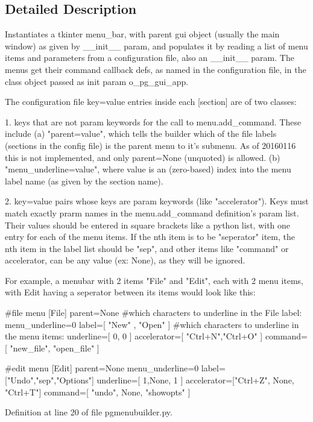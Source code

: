 \subsection{Detailed Description}
\begin{DoxyVerb}Instantiates a tkinter menu_bar, with parent gui object (usually the main window) 
as given by __init__ param, and populates it by reading a list of menu items and 
parameters from a configuration file, also an __init__ param. The menus get their 
command callback defs, as named in the configuration file, in the class object 
passed as init param o_pg_gui_app.

The configuration file key=value entries inside each [section] are of two classes:

1. keys that are not param keywords for the call to menu.add_command.  These include 
    (a) "parent=value", which tells the
    builder which of the file labels (sections in the config file) is the parent menu
    to it's submenu.  As of 20160116 this is not implemented, and only parent=None (unquoted) 
    is allowed.
    (b) "menu_underline=value", where value is an (zero-based) index into the menu label name 
    (as given by the section name).

2. key=value pairs whose keys are param keywords (like "accelerator").  Keys must match exactly
    prarm names in the menu.add_command definition's param list.  Their values should be 
    entered in square brackets like a python list, with one entry for each of the menu items.  
    If the nth item is to be "seperator" item, the nth item in the label list should be 
    "sep", and other items like "command" or accelerator, can be any value (ex: None), 
    as they will be ignored.

For example, a menubar with 2 items "File" and "Edit", each with 2 menu items, with
Edit having a seperator between its items would look like this: 

#file menu
[File]
parent=None
#which characters to underline in the File label:
menu_underline=0
label=[ "New" , "Open" ]
#which characters to underline in the menu items:
underline=[ 0, 0 ]
accelerator=[ "Ctrl+N","Ctrl+O" ]
command=[ "new_file", "open_file" ]

#edit menu
[Edit]
parent=None
menu_underline=0
label=["Undo","sep","Options"]
underline=[ 1,None, 1 ]
accelerator=["Ctrl+Z", None, "Ctrl+T"]
command=[ "undo", None, "showopts" ]  
\end{DoxyVerb}
 

Definition at line 20 of file pgmenubuilder.\+py.




